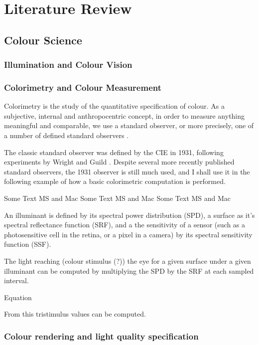 \chapter{Literature Review}
\label{LitReview}

\section{Colour Science}
\subsection{Illumination and Colour Vision}
\subsection{Colorimetry and Colour Measurement}

Colorimetry is the study of the quantitative specification of colour. As a subjective, internal and anthropocentric concept, in order to measure anything meaningful and comparable, we use a standard observer, or more precisely, one of a number of defined standard observers \cite{cie_bs_2011}.

The classic standard observer was defined by the CIE in 1931, following experiments by Wright and Guild \cite{wright_re-determination_1929, guild_colorimetric_1931}. Despite several more recently published standard observers, the 1931 observer is still much used, and I shall use it in the following example of how a basic colorimetric computation is performed.

Some Text \gls{MS} and \gls{Mac}
Some Text \gls{MS} and \gls{Mac}
Some Text \gls{MS} and \gls{Mac}

An illuminant is defined by its spectral power distribution (SPD), a surface as it's spectral reflectance function (SRF), and a the sensitivity of a sensor (such as a photosensitive cell in the retina, or a pixel in a camera) by its spectral sensitivity function (SSF).

The light reaching (colour stimulus (?)) the eye for a given surface under a given illuminant can be computed by multiplying the SPD by the SRF at each sampled interval.

Equation

From this tristimulus values can be computed.

\subsection{Colour rendering and light quality specification}

